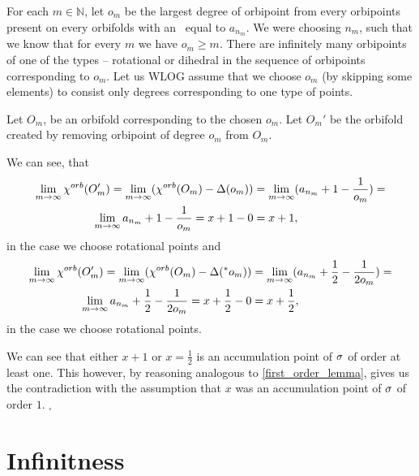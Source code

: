 For each $m \in \mathbb{N}$, let $o_m$ be the largest degree of orbipoint from every orbipoints 
present on every orbifolds with an \Eoc\ equal to $a_{n_m}$. 
We were choosing $n_m$, such that we know that for every $m$ we have $o_m \geq m$. 
There are infinitely many orbipoints of one of the types -- rotational or dihedral in the 
sequence of orbipoints corresponding to $o_m$. 
Let us WLOG assume that we choose $o_m$ (by skipping some elements) 
to consist only degrees corresponding to one type 
of points.

Let $O_m$, be an orbifold corresponding to the chosen $o_m$. Let $O_m'$ be the orbifold 
created by removing orbipoint of degree $o_m$ from $O_m$. 

We can see, that 
\begin{align}
\lim_{m\to \infty} {\chi^{orb}(O_m')} = \lim_{m\to\infty}( {\chi^{orb}(O_m)} - \Delta(o_m) )&= 
 \lim_{m\to\infty} (a_{n_m} + 1 - \frac{1}{o_m}) = \notag \\
 \lim_{m\to\infty} a_{n_m} + 1 -  \frac{1}{o_m} = x + 1 - 0 &= x+1,
\end{align} 
in the case we choose rotational points and 
\begin{align}
\lim_{m\to \infty} {\chi^{orb}(O_m')} = \lim_{m\to\infty}( {\chi^{orb}(O_m)} - \Delta(^*o_m) )&= 
 \lim_{m\to\infty} (a_{n_m} + \frac{1}{2} - \frac{1}{2o_m}) = \notag \\
 \lim_{m\to\infty} a_{n_m} + \frac{1}{2} -  \frac{1}{2o_m} = x + \frac{1}{2} - 0 &= x+\frac{1}{2},
\end{align} 
in the case we choose rotational points. 

We can see that either $x+1$ or $x = \frac{1}{2}$ is an accumulation point of ${\sigma}$ of order at 
least one. This however, by reasoning analogous to \ref{first_order_lemma}, 
gives us the contradiction 
with the assumption that $x$ was an accumulation point of ${\sigma}$ of order $1$. $_\square$



\section{Infinitness}\label{infiniteness}
